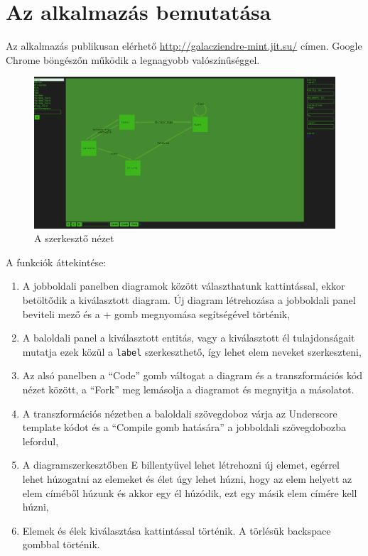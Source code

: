 \clearpage\section{Az alkalmazás bemutatása}

Az alkalmazás publikusan elérhető \url{http://galacziendre-mint.jit.su/} címen. Google Chrome böngészőn működik a legnagyobb valószínűséggel.

\begin{figure}[!ht]
\centering
\includegraphics[width=160mm, keepaspectratio]{figures/demo.png}
\caption{A szerkesztő nézet} 
\end{figure}

A funkciók áttekintése:

\begin{enumerate}
\item A jobboldali panelben diagramok között választhatunk kattintással, ekkor betöltődik a kiválasztott diagram. Új diagram létrehozása a jobboldali panel beviteli mező és a + gomb megnyomása segítségével történik,
\item A baloldali panel a kiválasztott entitás, vagy a kiválasztott él tulajdonságait mutatja ezek közül a \lstinline{label} szerkeszthető, így lehet elem neveket szerkeszteni,

\item Az alsó panelben a ``Code'' gomb váltogat a diagram és a transzformációs kód nézet között, a ``Fork'' meg lemásolja a diagramot és megnyitja a másolatot.
\item A transzformációs nézetben a baloldali szövegdoboz várja az Underscore template kódot és a ``Compile gomb hatására'' a jobboldali szövegdobozba lefordul,
\item A diagramszerkesztőben E billentyűvel lehet létrehozni új elemet, egérrel lehet húzogatni az elemeket és élet úgy lehet húzni, hogy az elem helyett az elem címéből húzunk és akkor egy él húzódik, ezt egy másik elem címére kell húzni,
\item Elemek és élek kiválasztása kattintással történik. A törlésük backspace gombbal történik.
\end{enumerate}

